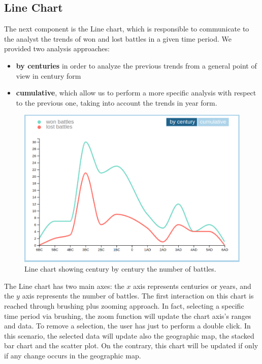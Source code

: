 \subsection{Line Chart}
The next component is the Line chart, which is responsible to communicate to the analyst the trends of won and lost battles in a given time period. We provided two analysis approaches:
\begin{itemize}
    \item \textbf{by centuries} in order to analyze the previous trends from a general point of view in century form
    \item \textbf{cumulative}, which allow us to perform a more specific analysis with respect to the previous one, taking into account the trends in year form.
\end{itemize}

\begin{figure}[h]
    \centering
    \includegraphics[scale=0.20]{./images/line_chart.png}
    \caption{Line chart showing century by century the number of battles.}
\end{figure}

The Line chart has two main axes: the $x$ axis represents centuries or years, and the $y$ axis represents the number of battles. The first interaction on this chart is reached through brushing plus zooming approach. In fact, selecting a specific time period via brushing, the zoom function will update the chart axis's ranges and data. To remove a selection, the user has just to perform a double click. In this scenario, the selected data will update also the geographic map, the stacked bar chart and the scatter plot. On the contrary, this chart will be updated if only if any change occurs in the geographic map.

